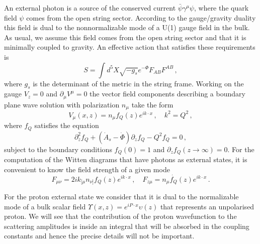 \documentclass[a4paper,12pt]{article}
\begin{document}
An external photon is a source of the conserved current $\bar{\psi} \gamma^\mu \psi$, where the quark field $\psi$ comes from the open string sector. According to the gauge/gravity duality this field is dual to the nonnormalizable mode of a U(1) gauge field in the bulk. As usual, we assume this field comes from the open string sector and that it is minimally coupled to gravity. An effective action that satisfies these requirements is
\begin{equation}
S =  \int d^5 X \sqrt{-g_s} e^{- \Phi}  F_{AB} F^{AB} \, ,
\label{eq:VM_new_action_string_frame}
\end{equation}
where $g_s$ is the determinant of the metric in the string frame. Working on the gauge $V_z = 0$ and $\partial_\mu V^{\mu} = 0$ the vector field components describing a boundary plane wave solution with polarization $n_\mu$ take the form
\begin{equation}
V_\mu \left(x, z\right) = n_\mu f_Q \left(z\right) e^{i k \cdot x} \, , \quad k^2 = Q^2 \, ,
\end{equation}
where $f_Q$ satisfies the equation
\begin{equation}
\partial_z^2 f_Q + (\dot{A}_s - \dot{\Phi}) \partial_z f_Q - Q^2 f_Q = 0 \, ,
\end{equation}
subject to the boundary conditions $f_Q\left(0\right) = 1$ and $\partial_z f_Q \left( z \to \infty \right) = 0$.
For the computation of the Witten diagrams that have photons as external states, it is convenient to know the field strength of a given mode
\begin{equation}
F_{\mu \nu} = 2 i k_{[ \mu} n_{\nu ]} f_Q (z) e^{i k \cdot x} \, , \quad F_{z \mu} = n_\mu \dot{f_Q} (z)e^{i k \cdot x} \, .
\label{eq:strength_tensor}
\end{equation}

For the proton external state we consider that it is dual to the normalizable mode of a bulk scalar field $\Upsilon\left(x, z\right) = e^{i P \cdot x} \upsilon\left(z\right)$ that represents an unpolarised proton. We will see that the contribution of the proton wavefunction to the scattering amplitudes is inside an integral that will be absorbed in the coupling constants and hence the precise details will not be important.
\end{document}
